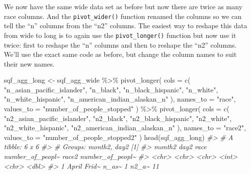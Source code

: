 \documentclass[
]{krantz}
\makeatletter
\newenvironment{Shaded}{\begin{snugshade}}{\end{snugshade}}
\newcommand{\AttributeTok}[1]{\textcolor[rgb]{0.61,0.61,0.61}{#1}}
\newcommand{\CommentTok}[1]{\textcolor[rgb]{0.37,0.37,0.37}{\textit{#1}}}
\newcommand{\FunctionTok}[1]{\textcolor[rgb]{0,0,0}{#1}}
\newcommand{\NormalTok}[1]{#1}
\newcommand{\OtherTok}[1]{\textcolor[rgb]{0.37,0.37,0.37}{#1}}
\newcommand{\SpecialCharTok}[1]{\textcolor[rgb]{0,0,0}{#1}}
\newcommand{\StringTok}[1]{\textcolor[rgb]{0.5,0.5,0.5}{#1}}
\newenvironment{kframe}{%
\medskip{}
\setlength{\fboxsep}{.8em}
 \def\at@end@of@kframe{}%
 \ifinner\ifhmode%
  \def\at@end@of@kframe{\end{minipage}}%
  \begin{minipage}{\columnwidth}%
 \fi\fi%
 \def\FrameCommand##1{\hskip\@totalleftmargin \hskip-\fboxsep
 \colorbox{shadecolor}{##1}\hskip-\fboxsep
     \hskip-\linewidth \hskip-\@totalleftmargin \hskip\columnwidth}%
 \MakeFramed {\advance\hsize-\width
   \@totalleftmargin\z@ \linewidth\hsize
   \@setminipage}}%
 {\par\unskip\endMakeFramed%
 \at@end@of@kframe}
\renewenvironment{Shaded}{\begin{kframe}}{\end{kframe}}
\makeatother
\begin{document}
We now have the same wide data set as before but now there
are twice as many race columns. And the
\texttt{pivot\_wider()} function renamed the columns so we
can tell the ``n'' columns from the ``n2'' columns. The
easiest way to reshape this data from wide to long is to
again use the \texttt{pivot\_longer()} function but now use
it twice: first to reshape the ``n'' columns and then to
reshape the ``n2'' columns. We'll use the exact same code as
before, but change the column names to suit their new names.

\begin{Shaded}
\begin{Highlighting}[]
\NormalTok{sqf\_agg\_long }\OtherTok{\textless{}{-}}\NormalTok{ sqf\_agg\_wide }\SpecialCharTok{\%\textgreater{}\%}
  \FunctionTok{pivot\_longer}\NormalTok{(}
    \AttributeTok{cols =} \FunctionTok{c}\NormalTok{(}
      \StringTok{"n\_asian\_pacific\_islander"}\NormalTok{,}
      \StringTok{"n\_black"}\NormalTok{,}
      \StringTok{"n\_black\_hispanic"}\NormalTok{,}
      \StringTok{"n\_white"}\NormalTok{,}
      \StringTok{"n\_white\_hispanic"}\NormalTok{,}
      \StringTok{"n\_american\_indian\_alaskan\_n"}
\NormalTok{    ),}
    \AttributeTok{names\_to =} \StringTok{"race"}\NormalTok{,}
    \AttributeTok{values\_to =} \StringTok{"number\_of\_people\_stopped"}
\NormalTok{  ) }\SpecialCharTok{\%\textgreater{}\%}
  \FunctionTok{pivot\_longer}\NormalTok{(}
    \AttributeTok{cols =} \FunctionTok{c}\NormalTok{(}
      \StringTok{"n2\_asian\_pacific\_islander"}\NormalTok{,}
      \StringTok{"n2\_black"}\NormalTok{,}
      \StringTok{"n2\_black\_hispanic"}\NormalTok{,}
      \StringTok{"n2\_white"}\NormalTok{,}
      \StringTok{"n2\_white\_hispanic"}\NormalTok{,}
      \StringTok{"n2\_american\_indian\_alaskan\_n"}
\NormalTok{    ),}
    \AttributeTok{names\_to =} \StringTok{"race2"}\NormalTok{,}
    \AttributeTok{values\_to =} \StringTok{"number\_of\_people\_stopped2"}
\NormalTok{  )}
\FunctionTok{head}\NormalTok{(sqf\_agg\_long)}
\CommentTok{\#\textgreater{} \# A tibble: 6 x 6}
\CommentTok{\#\textgreater{} \# Groups:   month2, day2 [1]}
\CommentTok{\#\textgreater{}   month2 day2  race  number\_of\_peopl\textasciitilde{} race2 number\_of\_peopl\textasciitilde{}}
\CommentTok{\#\textgreater{}   \textless{}chr\textgreater{}  \textless{}chr\textgreater{} \textless{}chr\textgreater{}            \textless{}int\textgreater{} \textless{}chr\textgreater{}            \textless{}dbl\textgreater{}}
\CommentTok{\#\textgreater{} 1 April  Frid\textasciitilde{} n\_as\textasciitilde{}                1 n2\_a\textasciitilde{}               11}

\end{Highlighting}
\end{Shaded}
\end{document}
